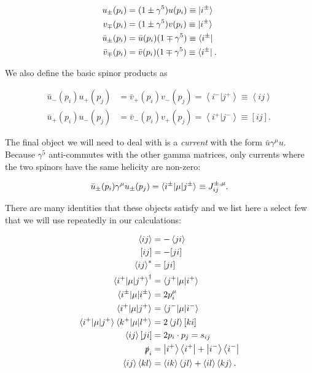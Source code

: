 \begin{subequations}
\begin{align}
u_{\pm}(p_i) &= (1 \pm \gamma^5)u(p_i) \equiv \mathinner{\lvert i^\pm\rangle}_{\hspace{-0.1em}}\\
v_{\mp}(p_i) &= (1 \pm \gamma^5)v(p_i) \equiv \mathinner{\lvert i^\pm\rangle}_{\hspace{-0.1em}}\\
\bar{u}_{\pm}(p_i) &= \bar{u}(p_i) (1 \mp \gamma^5) \equiv \mathinner{\langle i^\pm\rvert}_{}\\
\bar{v}_{\mp}(p_i) &= \bar{v}(p_i) (1 \mp \gamma^5) \equiv \mathinner{\langle i^\pm\rvert}_{}.
\end{align}
\end{subequations}

We also define the basic spinor products as

\begin{subequations}
\begin{align}
\bar{u}_-(p_i)u_+(p_j) &= \bar{v}_+(p_i)v_-(p_j) = \left<i^- | j^+ \right> \equiv \left< i j \right> \\
\bar{u}_+(p_i)u_-(p_j) &= \bar{v}_-(p_i)v_+(p_j) = \left<i^+ | j^- \right> \equiv \left[ i j \right].
\end{align}
\end{subequations}

The final object we will need to deal with is a \emph{current} with the form $\bar{u} \gamma^\mu u$. Because $\gamma^5$ anti-commutes with the other gamma matrices, only currents where the two spinors have the same helicity are non-zero:

\begin{equation}
\bar{u}_{\pm}(p_i) \gamma^\mu u_{\pm}(p_j) = \mathinner{\langle i^\pm\vert\mu\vert j^\pm\rangle}_{} \equiv J_{ij}^{\pm, \mu}.
\end{equation}

There are many identities that these objects satisfy \cite{Dixon1996} and we list here a select few that we will use repeatedly in our calculations:

\begin{subequations}
\begin{align}
\left<i j \right> &= - \left<j i \right> \\
[i j] &= - [ji] \\
\left< i j \right>^* &= [j i ] \\
\mathinner{\langle i^+\vert\mu\vert j^+\rangle}_{}^\dagger &= \mathinner{\langle j^+\vert\mu\vert i^+\rangle}_{} \\
\mathinner{\langle i^\pm\vert\mu\vert i^\pm\rangle}_{} &= 2p_i^\mu \\
\mathinner{\langle i^+\vert\mu\vert j^+\rangle}_{} &= \mathinner{\langle j^-\vert\mu\vert i^-\rangle}_{} \\
\mathinner{\langle i^+\vert\mu\vert j^+\rangle}_{} \mathinner{\langle k^+\vert\mu\vert l^+\rangle}_{} &= 2 \left<j l \right> \left[k i \right] \\
 \left<i j \right> [ji] &= 2 p_i \cdot p_j = s_{ij} \\
\slashed{p}_i&= \left| i^+ \right> \left<i^+ \right| + \left|i^- \right> \left <i^- \right| \\
\left< i j \right> \left< k l \right> &= \left<i k \right> \left< j l \right> + \left< i l \right> \left< k j \right>.
\end{align}
\end{subequations}

